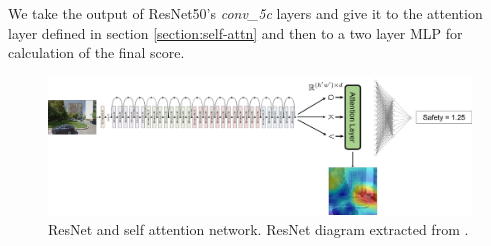 We take the output of ResNet50's \textit{conv\_5c} layers and give it to the attention layer
defined in section \ref{section:self-attn} and then to a two layer MLP for calculation of the final score.

\begin{figure}[ht]
	\begin{center}
	\includegraphics[width=1\textwidth]{./figures/attn_baseline.png}
	\caption[ResNet + SelfAttention]{ResNet and self attention network. ResNet diagram extracted from .}
	\label{fig:attn_resnet}
	\end{center}
\end{figure}